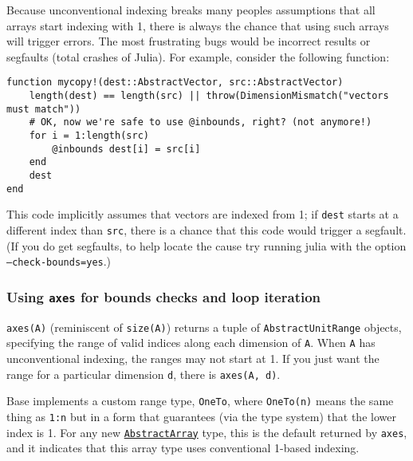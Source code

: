 Because unconventional indexing breaks many people{\textquotesingle}s assumptions that all arrays start indexing with 1, there is always the chance that using such arrays will trigger errors. The most frustrating bugs would be incorrect results or segfaults (total crashes of Julia). For example, consider the following function:




\begin{verbatim}
function mycopy!(dest::AbstractVector, src::AbstractVector)
    length(dest) == length(src) || throw(DimensionMismatch("vectors must match"))
    # OK, now we're safe to use @inbounds, right? (not anymore!)
    for i = 1:length(src)
        @inbounds dest[i] = src[i]
    end
    dest
end
\end{verbatim}



This code implicitly assumes that vectors are indexed from 1; if \texttt{dest} starts at a different index than \texttt{src}, there is a chance that this code would trigger a segfault. (If you do get segfaults, to help locate the cause try running julia with the option \texttt{--check-bounds=yes}.)



\hypertarget{1628519832551402952}{}


\subsubsection{Using \texttt{axes} for bounds checks and loop iteration}



\texttt{axes(A)} (reminiscent of \texttt{size(A)}) returns a tuple of \texttt{AbstractUnitRange} objects, specifying the range of valid indices along each dimension of \texttt{A}.  When \texttt{A} has unconventional indexing, the ranges may not start at 1.  If you just want the range for a particular dimension \texttt{d}, there is \texttt{axes(A, d)}.



Base implements a custom range type, \texttt{OneTo}, where \texttt{OneTo(n)} means the same thing as \texttt{1:n} but in a form that guarantees (via the type system) that the lower index is 1. For any new \hyperlink{6514416309183787338}{\texttt{AbstractArray}} type, this is the default returned by \texttt{axes}, and it indicates that this array type uses {\textquotedbl}conventional{\textquotedbl} 1-based indexing.



